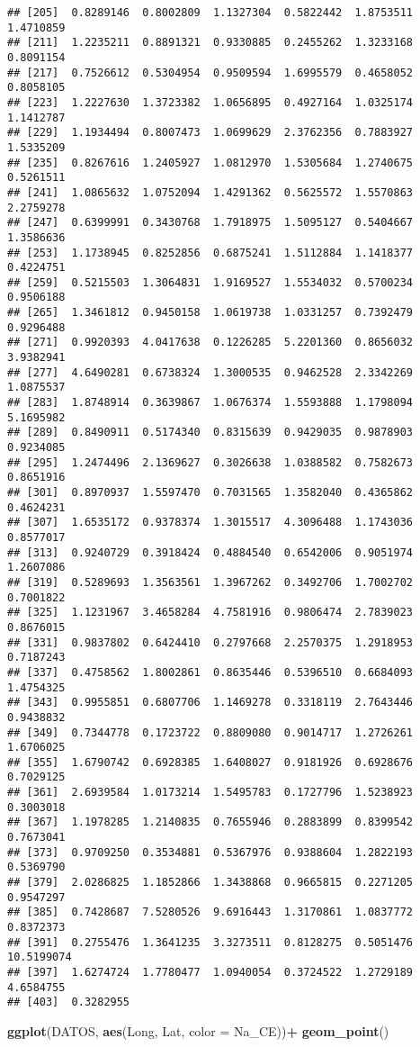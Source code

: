 \documentclass[
]{article}
\newenvironment{Shaded}{\begin{snugshade}}{\end{snugshade}}
\newcommand{\DataTypeTok}[1]{\textcolor[rgb]{0.13,0.29,0.53}{#1}}
\newcommand{\KeywordTok}[1]{\textcolor[rgb]{0.13,0.29,0.53}{\textbf{#1}}}
\newcommand{\NormalTok}[1]{#1}
\newcommand{\OperatorTok}[1]{\textcolor[rgb]{0.81,0.36,0.00}{\textbf{#1}}}
\newcommand{\StringTok}[1]{\textcolor[rgb]{0.31,0.60,0.02}{#1}}
\begin{document}
\begin{verbatim}
## [205]  0.8289146  0.8002809  1.1327304  0.5822442  1.8753511  1.4710859
## [211]  1.2235211  0.8891321  0.9330885  0.2455262  1.3233168  0.8091154
## [217]  0.7526612  0.5304954  0.9509594  1.6995579  0.4658052  0.8058105
## [223]  1.2227630  1.3723382  1.0656895  0.4927164  1.0325174  1.1412787
## [229]  1.1934494  0.8007473  1.0699629  2.3762356  0.7883927  1.5335209
## [235]  0.8267616  1.2405927  1.0812970  1.5305684  1.2740675  0.5261511
## [241]  1.0865632  1.0752094  1.4291362  0.5625572  1.5570863  2.2759278
## [247]  0.6399991  0.3430768  1.7918975  1.5095127  0.5404667  1.3586636
## [253]  1.1738945  0.8252856  0.6875241  1.5112884  1.1418377  0.4224751
## [259]  0.5215503  1.3064831  1.9169527  1.5534032  0.5700234  0.9506188
## [265]  1.3461812  0.9450158  1.0619738  1.0331257  0.7392479  0.9296488
## [271]  0.9920393  4.0417638  0.1226285  5.2201360  0.8656032  3.9382941
## [277]  4.6490281  0.6738324  1.3000535  0.9462528  2.3342269  1.0875537
## [283]  1.8748914  0.3639867  1.0676374  1.5593888  1.1798094  5.1695982
## [289]  0.8490911  0.5174340  0.8315639  0.9429035  0.9878903  0.9234085
## [295]  1.2474496  2.1369627  0.3026638  1.0388582  0.7582673  0.8651916
## [301]  0.8970937  1.5597470  0.7031565  1.3582040  0.4365862  0.4624231
## [307]  1.6535172  0.9378374  1.3015517  4.3096488  1.1743036  0.8577017
## [313]  0.9240729  0.3918424  0.4884540  0.6542006  0.9051974  1.2607086
## [319]  0.5289693  1.3563561  1.3967262  0.3492706  1.7002702  0.7001822
## [325]  1.1231967  3.4658284  4.7581916  0.9806474  2.7839023  0.8676015
## [331]  0.9837802  0.6424410  0.2797668  2.2570375  1.2918953  0.7187243
## [337]  0.4758562  1.8002861  0.8635446  0.5396510  0.6684093  1.4754325
## [343]  0.9955851  0.6807706  1.1469278  0.3318119  2.7643446  0.9438832
## [349]  0.7344778  0.1723722  0.8809080  0.9014717  1.2726261  1.6706025
## [355]  1.6790742  0.6928385  1.6408027  0.9181926  0.6928676  0.7029125
## [361]  2.6939584  1.0173214  1.5495783  0.1727796  1.5238923  0.3003018
## [367]  1.1978285  1.2140835  0.7655946  0.2883899  0.8399542  0.7673041
## [373]  0.9709250  0.3534881  0.5367976  0.9388604  1.2822193  0.5369790
## [379]  2.0286825  1.1852866  1.3438868  0.9665815  0.2271205  0.9547297
## [385]  0.7428687  7.5280526  9.6916443  1.3170861  1.0837772  0.8372373
## [391]  0.2755476  1.3641235  3.3273511  0.8128275  0.5051476 10.5199074
## [397]  1.6274724  1.7780477  1.0940054  0.3724522  1.2729189  4.6584755
## [403]  0.3282955
\end{verbatim}

\begin{Shaded}
\begin{Highlighting}[]
\KeywordTok{ggplot}\NormalTok{(DATOS, }\KeywordTok{aes}\NormalTok{(Long, Lat, }\DataTypeTok{color =}\NormalTok{ Na_CE))}\OperatorTok{+}
\StringTok{  }\KeywordTok{geom_point}\NormalTok{()}
\end{Highlighting}
\end{Shaded}
\end{document}
